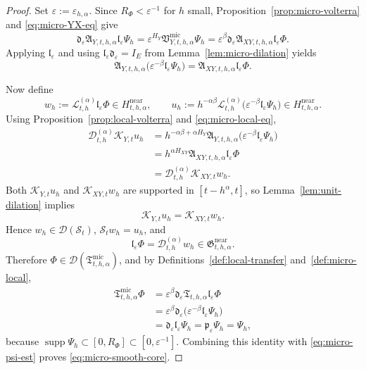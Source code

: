 \documentclass[11pt,a4paper]{amsart}
\theoremstyle{plain}
\theoremstyle{definition}
\theoremstyle{remark}
\begin{document}
\begin{proof}
Set \(\varepsilon:=\varepsilon_{h,\alpha}\). Since \(R_\Phi<\varepsilon^{-1}\) for \(h\) small,
Proposition~\ref{prop:micro-volterra} and \eqref{eq:micro-YX-eq} give
\[
\mathfrak d_{\varepsilon}
\mathfrak A_{Y,t,h,\alpha}
\mathfrak l_{\varepsilon}\Psi_h
=
\varepsilon^{H_Y}
\mathfrak V_{Y,t,h,\alpha}^{\mathrm{mic}}\Psi_h
=
\varepsilon^\beta
\mathfrak d_{\varepsilon}
\mathfrak A_{XY,t,h,\alpha}
\mathfrak l_{\varepsilon}\Phi.
\]
Applying \(\mathfrak l_{\varepsilon}\) and using
\(\mathfrak l_{\varepsilon}\mathfrak d_{\varepsilon}=I_E\) from
Lemma~\ref{lem:micro-dilation} yields
\begin{equation}\label{eq:micro-local-eq}
\mathfrak A_{Y,t,h,\alpha}
\bigl(
\varepsilon^{-\beta}\mathfrak l_{\varepsilon}\Psi_h
\bigr)
=
\mathfrak A_{XY,t,h,\alpha}\mathfrak l_{\varepsilon}\Phi.
\end{equation}

Now define
\[
w_h:=\mathcal L_{t,h}^{(\alpha)}\mathfrak l_{\varepsilon}\Phi
\in H_{t,h,\alpha}^{\mathrm{near}},
\qquad
u_h:=h^{-\alpha\beta}
\mathcal L_{t,h}^{(\alpha)}
\bigl(
\varepsilon^{-\beta}\mathfrak l_{\varepsilon}\Psi_h
\bigr)
\in H_{t,h,\alpha}^{\mathrm{near}}.
\]
Using Proposition~\ref{prop:local-volterra} and \eqref{eq:micro-local-eq},
\begin{align*}
\mathcal D_{t,h}^{(\alpha)}\mathcal K_{Y,t}u_h
&=
h^{-\alpha\beta+\alpha H_Y}
\mathfrak A_{Y,t,h,\alpha}
\bigl(
\varepsilon^{-\beta}\mathfrak l_{\varepsilon}\Psi_h
\bigr) \\
&=
h^{\alpha H_{XY}}
\mathfrak A_{XY,t,h,\alpha}\mathfrak l_{\varepsilon}\Phi \\
&=
\mathcal D_{t,h}^{(\alpha)}\mathcal K_{XY,t}w_h.
\end{align*}
Both \(\mathcal K_{Y,t}u_h\) and \(\mathcal K_{XY,t}w_h\) are supported in \([t-h^\alpha,t]\), so
Lemma~\ref{lem:unit-dilation} implies
\[
\mathcal K_{Y,t}u_h=\mathcal K_{XY,t}w_h.
\]
Hence \(w_h\in\mathcal D(\mathcal S_t)\), \(\mathcal S_t w_h=u_h\), and
\[
\mathfrak l_{\varepsilon}\Phi
=
\mathcal D_{t,h}^{(\alpha)}w_h
\in
\mathfrak G_{t,h,\alpha}^{\mathrm{near}}.
\]
Therefore \(\Phi\in\mathcal D(\mathfrak T_{t,h,\alpha}^{\mathrm{mic}})\), and by
Definitions~\ref{def:local-transfer} and~\ref{def:micro-local},
\begin{align*}
\mathfrak T_{t,h,\alpha}^{\mathrm{mic}}\Phi
&=
\varepsilon^\beta
\mathfrak d_{\varepsilon}
\mathfrak T_{t,h,\alpha}\mathfrak l_{\varepsilon}\Phi \\
&=
\varepsilon^\beta
\mathfrak d_{\varepsilon}
\bigl(
\varepsilon^{-\beta}\mathfrak l_{\varepsilon}\Psi_h
\bigr) \\
&=
\mathfrak d_{\varepsilon}\mathfrak l_{\varepsilon}\Psi_h
=
\mathfrak p_{\varepsilon}\Psi_h
=
\Psi_h,
\end{align*}
because \(\operatorname{supp}\Psi_h\subset[0,R_\Phi]\subset[0,\varepsilon^{-1}]\). Combining this
identity with \eqref{eq:micro-psi-est} proves \eqref{eq:micro-smooth-core}.
\end{proof}
\end{document}

